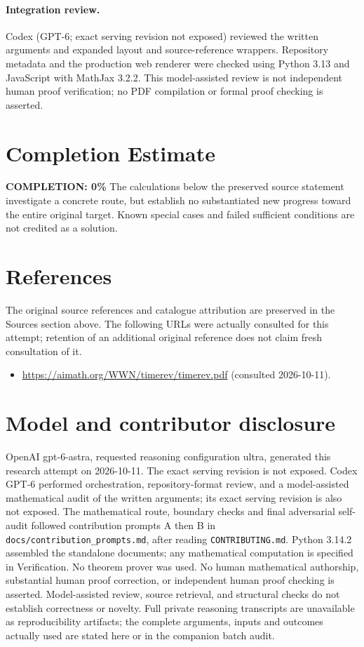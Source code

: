 \documentclass[11pt]{article}
\begin{document}
\paragraph{Integration review.} Codex (GPT-6; exact serving revision not exposed) reviewed the written arguments and expanded layout and source-reference wrappers. Repository metadata and the production web renderer were checked using Python 3.13 and JavaScript with MathJax 3.2.2. This model-assisted review is not independent human proof verification; no PDF compilation or formal proof checking is asserted.

\section{Completion Estimate}
\noindent\textbf{COMPLETION: 0\%}
The calculations below the preserved source statement investigate a concrete route,
but establish no substantiated new progress toward the entire original target.
Known special cases and failed sufficient conditions are not credited as a solution.
\section{References}
The original source references and catalogue attribution are preserved in the
Sources section above. The following URLs were actually consulted for this attempt;
retention of an additional original reference does not claim fresh consultation of it.
\begin{itemize}
\item \url{https://aimath.org/WWN/timerev/timerev.pdf} (consulted 2026-10-11). 
\end{itemize}
\section{Model and contributor disclosure}
OpenAI gpt-6-astra, requested reasoning configuration ultra, generated this research
attempt on 2026-10-11. The exact serving revision is not exposed. Codex GPT-6
performed orchestration, repository-format review, and a model-assisted mathematical
audit of the written arguments; its exact serving revision
is also not exposed. The mathematical route, boundary checks and final adversarial
self-audit followed contribution prompts A then B in
\texttt{docs/contribution\_prompts.md}, after reading \texttt{CONTRIBUTING.md}.
Python 3.14.2 assembled the standalone documents; any mathematical computation is
specified in Verification. No theorem prover was used. No human mathematical
authorship, substantial human proof correction, or independent human proof checking
is asserted. Model-assisted review, source retrieval, and structural checks do not
establish correctness or novelty. Full private reasoning transcripts are unavailable
as reproducibility artifacts; the complete arguments, inputs and outcomes actually
used are stated here or in the companion batch audit.
\end{document}

